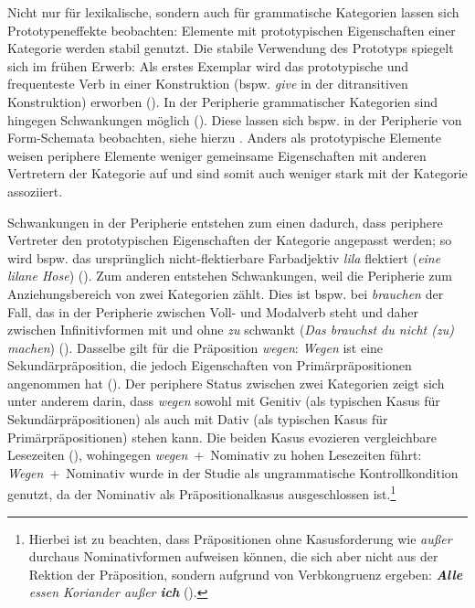 Nicht nur für lexikalische, sondern auch für grammatische Kategorien lassen sich Prototypeneffekte beobachten: Elemente mit prototypischen Eigenschaften einer Kategorie werden stabil genutzt. Die stabile Verwendung des Prototyps spiegelt sich im frühen Erwerb: Als erstes Exemplar wird das prototypische und frequenteste Verb in einer Konstruktion (bspw. \textit{give} in der ditransitiven Konstruktion) erworben (\cites{Ellis.2009}[58]{Ellis.2014}). In der Peripherie grammatischer Kategorien sind hingegen Schwankungen möglich (\cite[67--68]{Agel.2008}). Diese lassen sich bspw. in der Peripherie von Form-Schemata beobachten, siehe hierzu . Anders als prototypische Elemente weisen periphere Elemente weniger gemeinsame Eigenschaften mit anderen Vertretern der Kategorie auf und sind somit auch weniger stark mit der Kategorie assoziiert.

 Schwankungen in der Peripherie entstehen zum einen dadurch, dass periphere Vertreter den prototypischen Eigenschaften der Kategorie angepasst werden; so wird bspw. das ursprünglich nicht-flektier\-bare Farbadjektiv \textit{lila} flektiert (\textit{eine lilane Hose}) (\cite[67--68]{Agel.2008}). Zum anderen entstehen Schwankungen, weil die Peripherie zum Anziehungsbereich von zwei Kategorien zählt. Dies ist bspw. bei \textit{brauchen} der Fall, das in der Peripherie zwischen Voll- und Modalverb steht und daher zwischen Infinitivformen mit und ohne \textit{zu} schwankt (\textit{Das brauchst du nicht (zu) machen}) (\cite[11]{Eisenberg.1990}). Dasselbe gilt für die Präposition \textit{wegen}: \textit{Wegen} ist eine Sekundärpräposition, die jedoch Eigenschaften von Primärpräpositionen angenommen hat (\cites[100--101]{Schmitt.2019b}[74]{Vieregge.2019}). Der periphere Status zwischen zwei Kategorien zeigt sich unter anderem darin, dass \textit{wegen} sowohl mit Genitiv (als typischen Kasus für Sekundärpräpositionen) als auch mit Dativ (als typischen Kasus für Primärpräpositionen) stehen kann. Die beiden Kasus evozieren vergleichbare Lesezeiten (\cite[115--120]{Schmitt.2019b}), wohingegen \textit{wegen}~+~Nominativ zu hohen Lesezeiten führt: \textit{Wegen}~+~Nominativ wurde in der Studie als ungrammatische Kontrollkondition genutzt, da der Nominativ als Präpositionalkasus ausgeschlossen ist.\footnote{Hierbei ist zu beachten, dass Präpositionen ohne Kasusforderung wie \textit{außer} durchaus Nominativformen aufweisen können, die sich aber nicht aus der Rektion der Präposition, sondern aufgrund von Verb\-kongruenz ergeben: \textit{\textbf{Alle} essen Koriander außer \textbf{ich}} (\cite[46--47]{DiMeola.2000}).}\largerpage

